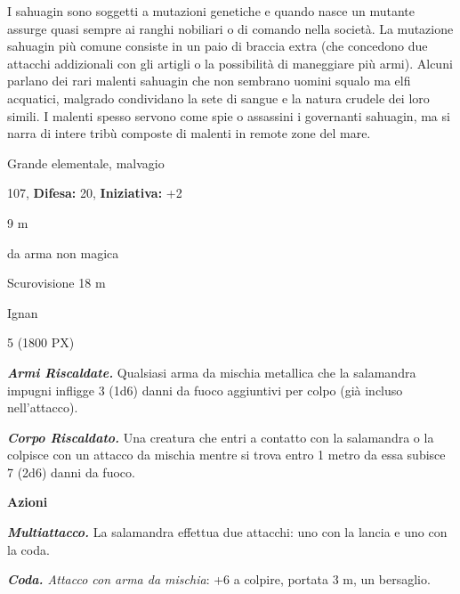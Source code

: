 \begin{multicols}{2}
{I sahuagin sono soggetti a mutazioni genetiche e quando nasce un mutante assurge quasi sempre ai ranghi nobiliari o di comando nella società. La mutazione sahuagin più comune consiste in un paio di braccia extra (che concedono due attacchi addizionali con gli artigli o la possibilità di maneggiare più armi). Alcuni parlano dei rari malenti sahuagin che non sembrano uomini squalo ma elfi acquatici, malgrado condividano la sete di sangue e la natura crudele dei loro simili. I malenti spesso servono come spie o assassini i governanti sahuagin, ma si narra di intere tribù composte di malenti in remote zone del mare.

\noindent
\begin{description}[noitemsep, topsep=0pt, parsep=0pt, partopsep=0pt, leftmargin=0cm, labelwidth=2.2cm]
	\item[\textbf{Taglia/Tipo:}] Grande elementale, malvagio
	\item[\textbf{Caratt.:}] 
	\item[\textbf{Punti Ferita:}] 107,  \textbf{Difesa:} 20,  \textbf{Iniziativa:} +2
	\item[\textbf{Movimento:}] 9 m
	\item[\textbf{Tiri Salvez.:}] 
	\item[\textbf{Res. Danni:}] da arma non magica
	\item[\textbf{Sensi:}] Scurovisione 18 m
	\item[\textbf{Linguaggi:}] Ignan
	\item[\textbf{Sfida:}] 5 (1800 PX)\smallskip
\end{description}

\emph{\textbf{Armi Riscaldate.}} Qualsiasi arma da mischia metallica che la salamandra impugni infligge 3 (1d6) danni da fuoco aggiuntivi per colpo (già incluso nell'attacco).

\emph{\textbf{Corpo Riscaldato.}} Una creatura che entri a contatto con la salamandra o la colpisce con un attacco da mischia mentre si trova entro 1 metro da essa subisce 7 (2d6) danni da fuoco.

\textbf{Azioni}

\emph{\textbf{Multiattacco.}} La salamandra effettua due attacchi: uno con la lancia e uno con la coda.

\emph{\textbf{Coda.} Attacco con arma da mischia}: +6 a colpire, portata 3 m, un bersaglio.

}
\end{multicols}
